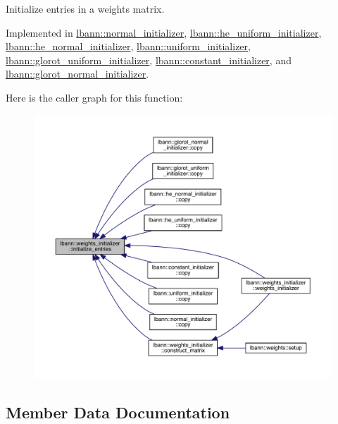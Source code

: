 Initialize entries in a weights matrix. 

Implemented in \hyperlink{classlbann_1_1normal__initializer_a3958aa3e88af76077cc7559eba0a5a17}{lbann\+::normal\+\_\+initializer}, \hyperlink{classlbann_1_1he__uniform__initializer_a8f86401b0b216ba159f57d3475769a24}{lbann\+::he\+\_\+uniform\+\_\+initializer}, \hyperlink{classlbann_1_1he__normal__initializer_a01d283880fc0c1b743bcc89e732f4e15}{lbann\+::he\+\_\+normal\+\_\+initializer}, \hyperlink{classlbann_1_1uniform__initializer_a23461a8ab897f0aeafc524a61cb0f4eb}{lbann\+::uniform\+\_\+initializer}, \hyperlink{classlbann_1_1glorot__uniform__initializer_a3a44410934f791cee272183a6a36ae0c}{lbann\+::glorot\+\_\+uniform\+\_\+initializer}, \hyperlink{classlbann_1_1constant__initializer_ae3fb3bba90bd6a7e393ecc223aa5d62c}{lbann\+::constant\+\_\+initializer}, and \hyperlink{classlbann_1_1glorot__normal__initializer_a0bd7253159fe5ca9039af44b7fca1709}{lbann\+::glorot\+\_\+normal\+\_\+initializer}.

Here is the caller graph for this function\+:\nopagebreak
\begin{figure}[H]
\begin{center}
\leavevmode
\includegraphics[width=350pt]{classlbann_1_1weights__initializer_a2ad6acf904c0c7bc7406dbd9851107be_icgraph}
\end{center}
\end{figure}


\subsection{Member Data Documentation}
\mbox{\label{classlbann_1_1weights__initializer_a4273257d92237a75ef9f3614f7e5ddde}} 
